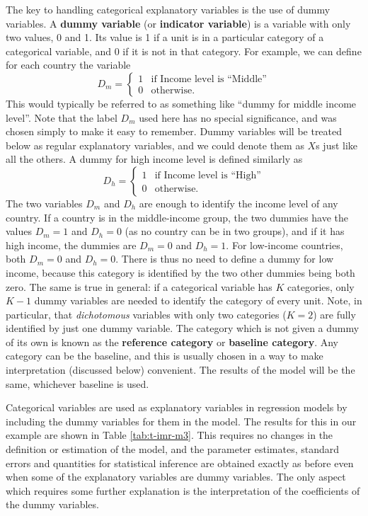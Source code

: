 \documentclass[11pt,a4paper,openany]{book}
\begin{document}
The key to handling categorical explanatory variables is the use of
dummy variables. A \textbf{dummy variable} (or \textbf{indicator
variable}) is a variable with only two values, 0 and 1. Its value is 1
if a unit is in a particular category of a categorical variable, and 0
if it is not in that category. For example, we can define for each
country the variable \[D_{m}=\begin{cases}
1 & \text{if Income level is ``Middle''} \\
0 & \text{otherwise.}
\end{cases}\] This would typically be referred to as something like
``dummy for middle income level''. Note that the label \(D_{m}\) used
here has no special significance, and was chosen simply to make it easy
to remember. Dummy variables will be treated below as regular
explanatory variables, and we could denote them as \(X\)s just like all
the others. A dummy for high income level is defined similarly as
\[D_{h}=\begin{cases}
1 & \text{if Income level is ``High''} \\
0 & \text{otherwise.}
\end{cases}\] The two variables \(D_{m}\) and \(D_{h}\) are enough to
identify the income level of any country. If a country is in the
middle-income group, the two dummies have the values \(D_{m}=1\) and
\(D_{h}=0\) (as no country can be in two groups), and if it has high
income, the dummies are \(D_{m}=0\) and \(D_{h}=1\). For low-income
countries, both \(D_{m}=0\) and \(D_{h}=0\). There is thus no need to
define a dummy for low income, because this category is identified by
the two other dummies being both zero. The same is true in general: if a
categorical variable has \(K\) categories, only \(K-1\) dummy variables
are needed to identify the category of every unit. Note, in particular,
that \emph{dichotomous} variables with only two categories (\(K=2\)) are
fully identified by just one dummy variable. The category which is not
given a dummy of its own is known as the \textbf{reference category} or
\textbf{baseline category}. Any category can be the baseline, and this
is usually chosen in a way to make interpretation (discussed below)
convenient. The results of the model will be the same, whichever
baseline is used.

Categorical variables are used as explanatory variables in regression
models by including the dummy variables for them in the model. The
results for this in our example are shown in Table \ref{tab:t-imr-m3}.
This requires no changes in the definition or estimation of the model,
and the parameter estimates, standard errors and quantities for
statistical inference are obtained exactly as before even when some of
the explanatory variables are dummy variables. The only aspect which
requires some further explanation is the interpretation of the
coefficients of the dummy variables.
\end{document}
